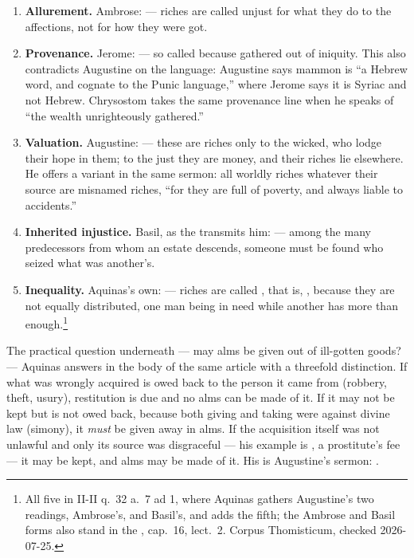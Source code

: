 \begin{enumerate}[leftmargin=1.6em, itemsep=0.25em]
\item \textbf{Allurement.} Ambrose:  --- riches are called unjust for what they do to the affections, not
for how they were got.
\item \textbf{Provenance.} Jerome:  ---
so called because gathered out of iniquity. This also contradicts Augustine on
the language: Augustine says mammon is ``a Hebrew word, and cognate to the
Punic language,'' where Jerome says it is Syriac and not Hebrew. Chrysostom
takes the same provenance line when he speaks of ``the wealth unrighteously
gathered.''
\item \textbf{Valuation.} Augustine:  --- these are riches only to the wicked,
who lodge their hope in them; to the just they are money, and their riches lie
elsewhere. He offers a variant in the same sermon: all worldly riches whatever
their source are misnamed riches, ``for they are full of poverty, and always
liable to accidents.''
\item \textbf{Inherited injustice.} Basil, as the  transmits him:
 --- among the many predecessors from whom an estate
descends, someone must be found who seized what was another's.
\item \textbf{Inequality.} Aquinas's own:  --- riches are called ,
that is, , because they are not equally distributed, one
man being in need while another has more than enough.\footnote{All five in
 II-II q.\ 32 a.\ 7 ad 1, where Aquinas gathers Augustine's two
readings, Ambrose's, and Basil's, and adds the fifth; the Ambrose and Basil
forms also stand in the , cap.\ 16, lect.\ 2. Corpus
Thomisticum, checked 2026-07-25.}
\end{enumerate}

The practical question underneath --- may alms be given out of ill-gotten goods?
--- Aquinas answers in the body of the same article with a threefold
distinction. If what was wrongly acquired is owed back to the person it came
from (robbery, theft, usury), restitution is due and no alms can be made of it.
If it may not be kept but is not owed back, because both giving and taking were
against divine law (simony), it \emph{must} be given away in alms. If the
acquisition itself was not unlawful and only its source was disgraceful ---
his example is , a prostitute's fee --- it may be kept, and
alms may be made of it. His  is Augustine's sermon:
.


